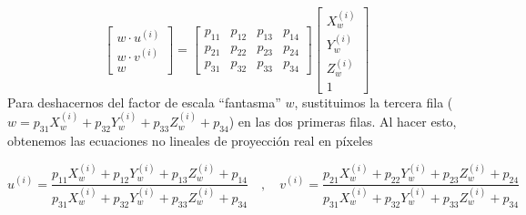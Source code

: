 \begin{enumerate}
    $$\begin{bmatrix} w \cdot u^{(i)} \\ w \cdot v^{(i)} \\ w \end{bmatrix} = \begin{bmatrix} p_{11} & p_{12} & p_{13} & p_{14} \\ p_{21} & p_{22} & p_{23} & p_{24} \\ p_{31} & p_{32} & p_{33} & p_{34} \end{bmatrix} \begin{bmatrix} X_w^{(i)} \\ Y_w^{(i)} \\ Z_w^{(i)} \\ 1 \end{bmatrix}$$
    Para deshacernos del factor de escala ``fantasma'' $w$, sustituimos la tercera fila ($w = p_{31}X_w^{(i)} + p_{32}Y_w^{(i)} + p_{33}Z_w^{(i)} + p_{34}$) en las dos primeras filas. Al hacer esto, obtenemos las ecuaciones no lineales de proyección real en píxeles
        
        $$u^{(i)} = \frac{p_{11}X_w^{(i)} + p_{12}Y_w^{(i)} + p_{13}Z_w^{(i)} + p_{14}}{p_{31}X_w^{(i)} + p_{32}Y_w^{(i)} + p_{33}Z_w^{(i)} + p_{34}} \quad , \quad v^{(i)} = \frac{p_{21}X_w^{(i)} + p_{22}Y_w^{(i)} + p_{23}Z_w^{(i)} + p_{24}}{p_{31}X_w^{(i)} + p_{32}Y_w^{(i)} + p_{33}Z_w^{(i)} + p_{34}}$$
    

\end{enumerate}
